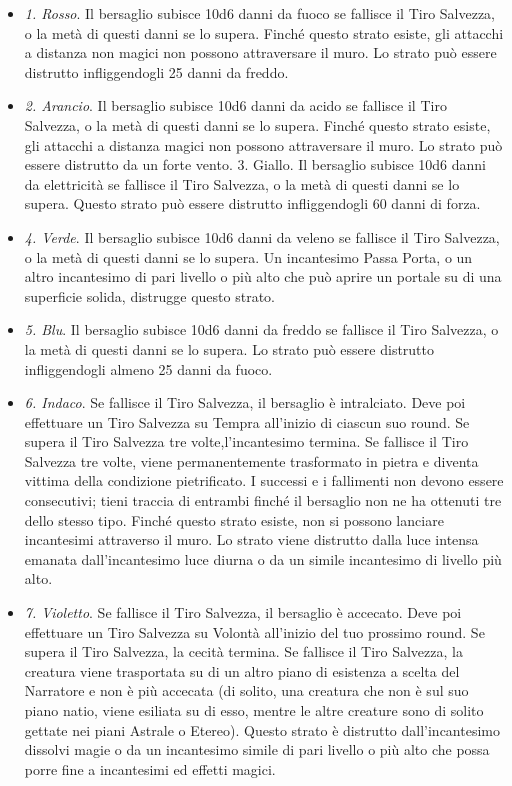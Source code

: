 \begin{multicols}{2}
\begin{itemize}[leftmargin=*] \setlength{\itemsep}{0pt}
	\item \emph{1. Rosso}. Il bersaglio subisce 10d6 danni da fuoco se fallisce il Tiro Salvezza, o la metà di questi danni se lo supera. Finché questo strato esiste, gli attacchi a distanza non magici non possono attraversare il muro. Lo strato può essere distrutto infliggendogli 25 danni da freddo.
	\item \emph{2. Arancio}. Il bersaglio subisce 10d6 danni da acido se fallisce il Tiro Salvezza, o la metà di questi danni se lo supera. Finché questo strato esiste, gli attacchi a distanza magici non possono attraversare il muro. Lo strato può essere distrutto da un forte vento. 3. Giallo. Il bersaglio subisce 10d6 danni da elettricità se fallisce il Tiro Salvezza, o la metà di questi danni se lo supera. Questo strato può essere distrutto infliggendogli 60 danni di forza.
	\item \emph{4. Verde}. Il bersaglio subisce 10d6 danni da veleno se fallisce il Tiro Salvezza, o la metà di questi danni se lo supera. Un incantesimo Passa Porta, o un altro incantesimo di pari livello o più alto che può aprire un portale su di una superficie solida, distrugge questo strato.
	\item \emph{5. Blu}. Il bersaglio subisce 10d6 danni da freddo se fallisce il Tiro Salvezza, o la metà di questi danni se lo supera. Lo strato può essere distrutto infliggendogli almeno 25 danni da fuoco.
	\item \emph{6. Indaco}. Se fallisce il Tiro Salvezza, il bersaglio è intralciato. Deve poi effettuare un Tiro Salvezza su Tempra all'inizio di ciascun suo round. Se supera il Tiro Salvezza tre volte,l'incantesimo termina. Se fallisce il Tiro Salvezza tre volte, viene permanentemente trasformato in pietra e diventa vittima della condizione pietrificato. I successi e i fallimenti non devono essere consecutivi; tieni traccia di entrambi finché il bersaglio non ne ha ottenuti tre dello stesso tipo. Finché questo strato esiste, non si possono lanciare incantesimi attraverso il muro. Lo strato viene distrutto dalla luce intensa emanata dall'incantesimo luce diurna o da un simile incantesimo di livello più alto.
	\item \emph{7. Violetto}. Se fallisce il Tiro Salvezza, il bersaglio è accecato. Deve poi effettuare un Tiro Salvezza su Volontà all'inizio del tuo prossimo round. Se supera il Tiro Salvezza, la cecità termina. Se fallisce il Tiro Salvezza, la creatura viene trasportata su di un altro piano di esistenza a scelta del Narratore e non è più accecata (di solito, una creatura che non è sul suo piano natio, viene esiliata su di esso, mentre le altre creature sono di solito gettate nei piani Astrale o Etereo). Questo strato è distrutto dall'incantesimo dissolvi magie o da un incantesimo simile di pari livello o più alto che possa porre fine a incantesimi ed effetti magici.


\end{itemize}
\end{multicols}
